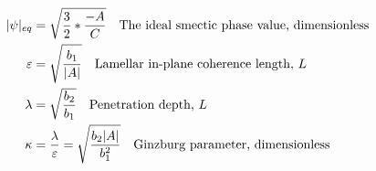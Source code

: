 \documentclass[11pt]{article}
\begin{document}
\begin{align}
    |\psi|_{eq} &= \sqrt{\frac{3}{2} * \frac{-A}{C}} \qq{The ideal smectic phase value, dimensionless}\\
    \varepsilon &= \sqrt{\frac{b_1}{|A|}} \qq{Lamellar in-plane coherence length, $L$} \\
    \lambda &= \sqrt{\frac{b_2}{b_1}} \qq{Penetration depth, $L$} \\
    \kappa &= \frac{\lambda}{\varepsilon} = \sqrt{\frac{b_2|A|}{b_1^2}} \qq{Ginzburg parameter, dimensionless}
\end{align}
\end{document}
